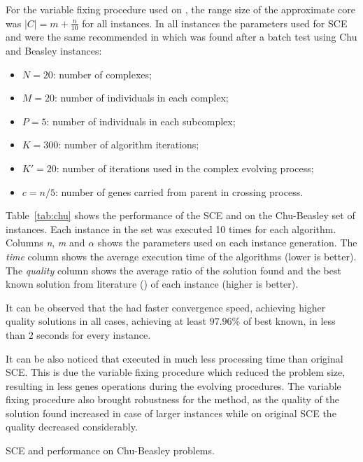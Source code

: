 For the variable fixing procedure used on \scecore, the range size of the approximate core was
$|C| = m+\frac{n}{10}$ for all instances.
In all instances the parameters used for SCE and \scecore were the same recommended
in \cite{baroni2015shuffled} which was found after a batch test using Chu and Beasley instances:
\begin{itemize}
  \item $N = 20$: number of complexes;
  \item $M = 20$: number of individuals in each complex;
  \item $P = 5$: number of individuals in each subcomplex;
  \item $K = 300$: number of algorithm iterations;
  \item $K' = 20$: number of iterations used in the complex evolving process;
  \item $c = n/5$: number of genes carried from parent in crossing process.
\end{itemize}

Table~\ref{tab:chu} shows the performance of the SCE and \scecore on the Chu-Beasley set of instances.
Each instance in the set was executed 10 times for each algorithm.
Columns \textit{n}, \textit{m} and \textit{$\alpha$} shows the parameters used
on each instance generation.
The \textit{time} column shows the average execution time of the algorithms (lower is better).
The \textit{quality} column shows the average ratio of the solution found and
the best known solution from literature (\cite{vimont2008reduced, della2012improved}) of each instance (higher is better).

It can be observed that the \scecore had faster convergence speed, achieving higher
quality solutions in all cases, achieving at least $97.96\%$ of best known, in less than $2$ seconds
for every instance.

It can be also noticed that \scecore executed in much less processing time than original
SCE.
This is due the variable fixing procedure which reduced the problem size,
resulting in less genes operations during the evolving procedures.
The variable fixing procedure also brought robustness for the method, as the quality
of the solution found increased in case of larger instances while on original
SCE the quality decreased considerably.

\begin{table}
 \caption{SCE and \scecore  performance on Chu-Beasley problems.}
{
\renewcommand{\arraystretch}{0.9}%
\fontsize{7.0pt}{1.2em}\selectfont 
\begin{center}
  
\end{center}
}
 \label{tab:chu}
\end{table}

